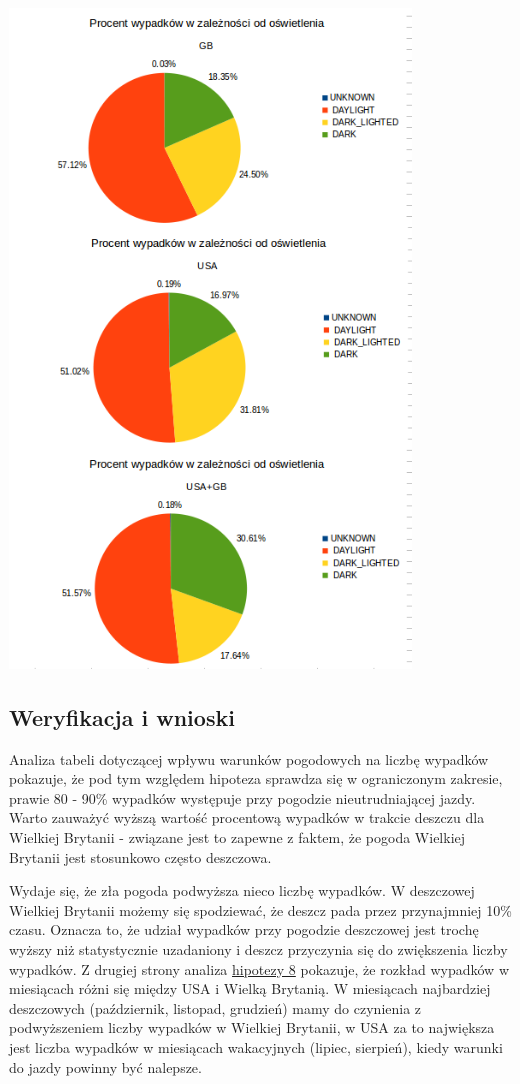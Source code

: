 \includegraphics[width=0.8\textwidth]{images/hipotheses/lighting/lighting.png}

\subsection{Weryfikacja i wnioski}\label{weryfikacja-i-wnioski}

Analiza tabeli dotyczącej wpływu warunków pogodowych na liczbę wypadków
pokazuje, że pod tym względem hipoteza sprawdza się w ograniczonym
zakresie, prawie 80 - 90\% wypadków występuje przy pogodzie
nieutrudniającej jazdy. Warto zauważyć wyższą wartość procentową
wypadków w trakcie deszczu dla Wielkiej Brytanii - związane jest to
zapewne z faktem, że pogoda Wielkiej Brytanii jest stosunkowo często
deszczowa.

Wydaje się, że zła pogoda podwyższa nieco liczbę wypadków. W deszczowej
Wielkiej Brytanii możemy się spodziewać, że deszcz pada przez
przynajmniej 10\% czasu. Oznacza to, że udział wypadków przy pogodzie
deszczowej jest trochę wyższy niż statystycznie uzadaniony i deszcz
przyczynia się do zwiększenia liczby wypadków. Z drugiej strony analiza
\href{Hipoteza-8}{hipotezy 8} pokazuje, że rozkład wypadków w miesiącach
różni się między USA i Wielką Brytanią. W miesiącach najbardziej
deszczowych (październik, listopad, grudzień) mamy do czynienia z
podwyższeniem liczby wypadków w Wielkiej Brytanii, w USA za to
największa jest liczba wypadków w miesiącach wakacyjnych (lipiec,
sierpień), kiedy warunki do jazdy powinny być nalepsze.

